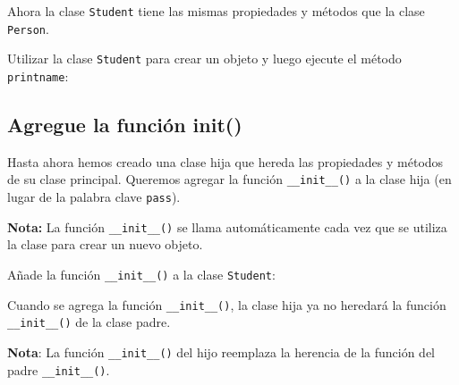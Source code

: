 Ahora la clase \texttt{Student} tiene las mismas propiedades y métodos que la clase \texttt{Person}. \\

\begin{code}
Utilizar la clase \texttt{Student} para crear un objeto y luego ejecute el método \texttt{printname}:

\begin{Shaded}
\begin{Highlighting}[]
\OperatorTok{=}\NormalTok{, }\NormalTok{)}
\end{Highlighting}
\end{Shaded}
\end{code}

\subsection{\texorpdfstring{Agregue la función \textbf{init}()}{Agregue la función init()}}

Hasta ahora hemos creado una clase hija que hereda las propiedades y
métodos de su clase principal. Queremos agregar la función
\texttt{\_\_init\_\_()} a la clase hija (en lugar de la palabra clave
\texttt{pass}).

\textbf{Nota:} La función \texttt{\_\_init\_\_()} se llama
automáticamente cada vez que se utiliza la clase para crear un nuevo
objeto.\\

\begin{code}
Añade la función \texttt{\_\_init\_\_()} a la clase \texttt{Student}:

\begin{Shaded}
\begin{Highlighting}[]
   \NormalTok{(}
\end{Highlighting}
\end{Shaded}
\end{code}

Cuando se agrega la función \texttt{\_\_init\_\_()}, la clase hija ya no heredará la función \texttt{\_\_init\_\_()} de la clase padre.

\textbf{Nota}: La función \texttt{\_\_init\_\_()} del hijo reemplaza la herencia de la función del padre \texttt{\_\_init\_\_()}.

